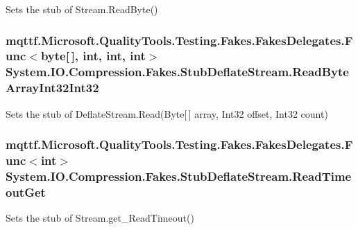 Sets the stub of Stream.\-Read\-Byte()

\hypertarget{class_system_1_1_i_o_1_1_compression_1_1_fakes_1_1_stub_deflate_stream_a45b4865b7be05dde8f0d53f758c3cdaa}{
\subsubsection[{Read\-Byte\-Array\-Int32\-Int32}]{\setlength{\rightskip}{0pt plus 5cm}mqttf.\-Microsoft.\-Quality\-Tools.\-Testing.\-Fakes.\-Fakes\-Delegates.\-Func$<$byte\mbox{[}$\,$\mbox{]}, int, int, int$>$ System.\-I\-O.\-Compression.\-Fakes.\-Stub\-Deflate\-Stream.\-Read\-Byte\-Array\-Int32\-Int32}}\label{class_system_1_1_i_o_1_1_compression_1_1_fakes_1_1_stub_deflate_stream_a45b4865b7be05dde8f0d53f758c3cdaa}


Sets the stub of Deflate\-Stream.\-Read(\-Byte\mbox{[}$\,$\mbox{]} array, Int32 offset, Int32 count)

\hypertarget{class_system_1_1_i_o_1_1_compression_1_1_fakes_1_1_stub_deflate_stream_a35ae91c87e2e522d666d6c0703bf8381}{
\subsubsection[{Read\-Timeout\-Get}]{\setlength{\rightskip}{0pt plus 5cm}mqttf.\-Microsoft.\-Quality\-Tools.\-Testing.\-Fakes.\-Fakes\-Delegates.\-Func$<$int$>$ System.\-I\-O.\-Compression.\-Fakes.\-Stub\-Deflate\-Stream.\-Read\-Timeout\-Get}}\label{class_system_1_1_i_o_1_1_compression_1_1_fakes_1_1_stub_deflate_stream_a35ae91c87e2e522d666d6c0703bf8381}


Sets the stub of Stream.\-get\-\_\-\-Read\-Timeout()

